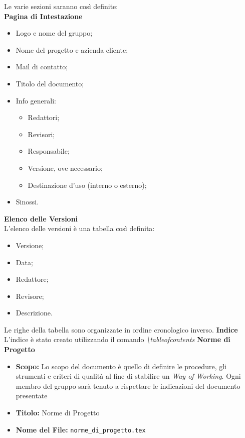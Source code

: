 \documentclass[a4paper, 12pt]{article}
\begin{document}
Le varie sezioni saranno così definite: \\

\textbf{Pagina di Intestazione} 
\begin{itemize}
    \item Logo e nome del gruppo;
    \item Nome del progetto e azienda cliente;
    \item Mail di contatto;
    \item Titolo del documento;
    \item Info generali:
    \begin{itemize}
        \item Redattori;
        \item Revisori;
        \item Responsabile;
        \item Versione, ove necessario;
        \item Destinazione d'uso (interno o esterno);
    \end{itemize}
    \item Sinossi.
\end{itemize}

\textbf{Elenco delle Versioni} \\
L'elenco delle versioni è una tabella così definita:
\begin{itemize}
    \item Versione;
    \item Data;
    \item Redattore;
    \item Revisore;
    \item Descrizione.
\end{itemize}
Le righe della tabella sono organizzate in ordine cronologico inverso. 
\newline \newline
\textbf{Indice} \\
L'indice è stato creato utilizzando il comando \textit{\textbackslash tableofcontents}
\newline \newline
\textbf{Norme di Progetto}
\begin{itemize}
    \item \textbf{Scopo:} Lo scopo del documento è quello di definire le procedure, gli strumenti e criteri di qualità al fine di stabilire un \textit{Way of Working}. Ogni membro del gruppo sarà tenuto a rispettare le indicazioni del documento presentate
    \item \textbf{Titolo:} Norme di Progetto
    \item \textbf{Nome del File:} \texttt{norme\_di\_progetto.tex}
\end{itemize} 
\end{document}
